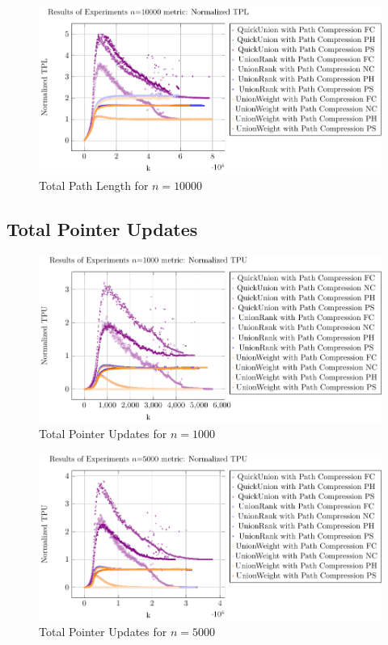 \documentclass[10pt,a4paper,hidelinks]{article}
\begin{document}
\begin{figure}[h!]
    \centering
    \includegraphics[width=0.80\linewidth]{plots/plot_10000_Normalized TPL.pdf}
    \caption{Total Path Length for $n = 10000$}
\end{figure}

\subsection{Total Pointer Updates}
\begin{figure}[h!]
    \centering
    \includegraphics[width=0.80\linewidth]{plots/plot_1000_Normalized TPU.pdf}
    \caption{Total Pointer Updates for $n = 1000$}
\end{figure}

\begin{figure}[h!]
    \centering
    \includegraphics[width=0.80\linewidth]{plots/plot_5000_Normalized TPU.pdf}
    \caption{Total Pointer Updates for $n = 5000$}
\end{figure}
\end{document}
